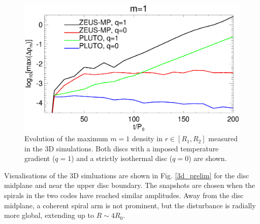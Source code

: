 \begin{figure}
  \includegraphics[width=\linewidth]{figures/m1_analysis_plot_ampmax3d.ps}
  \caption{Evolution of the maximum $m=1$ density in  $r\in[R_1,R_2]$
    measured in the 3D simulations. Both discs with a imposed
    temperature gradient ($q=1$) and a strictly isothermal disc
    ($q=0$) are shown.  
    \label{3d_ampmax}}   
\end{figure}

Visualisations of the 3D simluations are shown in   
Fig. \ref{3d_prelim} for the disc midplane and near the upper disc
boundary. The snapshots are chosen when the spirals in the two codes
have reached similar amplitudes. %
Away from the disc midplane, a coherent spiral arm is
not prominent, but the disturbance is radially more global, extending
up to $R\sim 4R_0$. %

